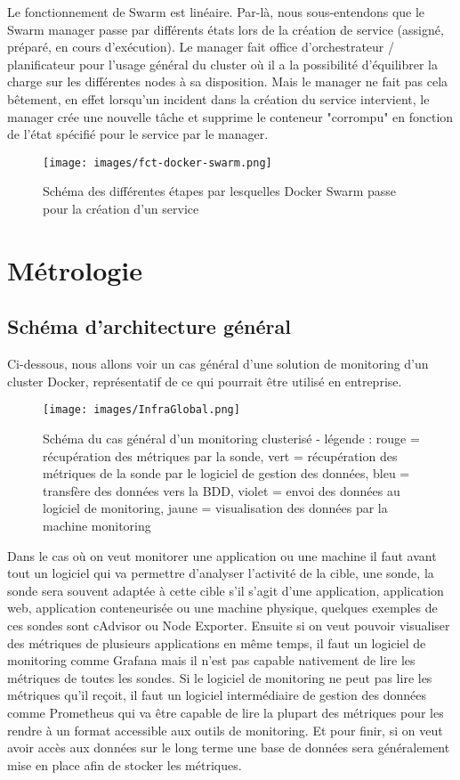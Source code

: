 \documentclass[oneside,12pt]{report}
\begin{document}
Le fonctionnement de Swarm est linéaire. Par-là, nous sous-entendons que le Swarm manager passe par différents états lors de la création de service (assigné, préparé, en cours d'exécution). Le manager fait office d'orchestrateur / planificateur pour l'usage général du cluster où il a la possibilité d'équilibrer la charge sur les différentes nodes à sa disposition. Mais le manager ne fait pas cela bêtement, en effet lorsqu'un incident dans la création du service intervient, le manager crée une nouvelle tâche et supprime le conteneur "corrompu" en fonction de l'état spécifié pour le service par le manager.

\begin{figure}[H]
    \centering
    \texttt{[image: images/fct-docker-swarm.png]}
    \caption{Schéma des différentes étapes par lesquelles Docker Swarm passe pour la création d'un service}
    \label{fig:mesh1}
\end{figure}

\chapter{Métrologie}

\section{Schéma d'architecture général}

Ci-dessous, nous allons voir un cas général d'une solution de monitoring d'un cluster Docker, représentatif de ce qui pourrait être utilisé en entreprise.

\begin{figure}[!ht]
    \centering
    \texttt{[image: images/InfraGlobal.png]}
    \caption{Schéma du cas général d'un monitoring clusterisé - légende : rouge = récupération des métriques par la sonde, vert = récupération des métriques de la sonde par le logiciel de gestion des données, bleu = transfère des données vers la BDD, violet = envoi des données au logiciel de monitoring, jaune = visualisation des données par la machine monitoring}
    \label{fig:mesh1}
\end{figure}

Dans le cas où on veut monitorer une application ou une machine il faut avant tout un logiciel qui va permettre d'analyser l'activité de la cible, une sonde, la sonde sera souvent adaptée à cette cible s'il s'agit d'une application, application web, application conteneurisée ou une machine physique, quelques exemples de ces sondes sont cAdvisor ou Node Exporter. Ensuite si on veut pouvoir visualiser des métriques de plusieurs applications en même temps, il faut un logiciel de monitoring comme Grafana mais il n'est pas capable nativement de lire les métriques de toutes les sondes. Si le logiciel de monitoring ne peut pas lire les métriques qu'il reçoit, il faut un logiciel intermédiaire de gestion des données comme Prometheus qui va être capable de lire la plupart des métriques pour les rendre à un format accessible aux outils de monitoring. Et pour finir, si on veut avoir accès aux données sur le long terme une base de données sera généralement mise en place afin de stocker les métriques. \newline
\end{document}
